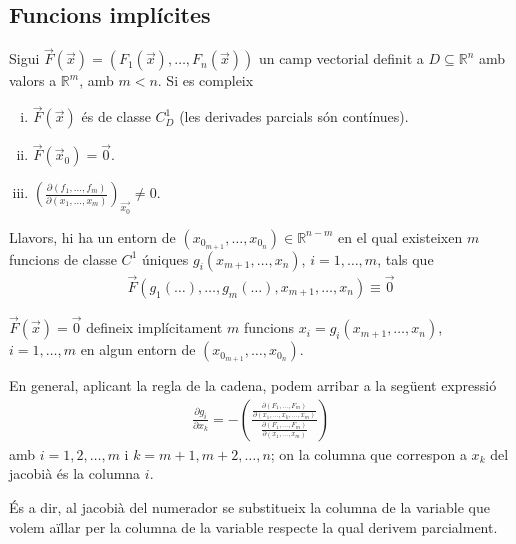 \subsection{Funcions implícites}
\begin{thm}
    Sigui $\vec{F}(\vec{x}) = (F_{1}(\vec{x}), \dots, F_{n}(\vec{x}))$ un camp vectorial definit a $D \subseteq \mathbb{R}^{n}$ amb valors a $\mathbb{R}^{m}$, amb $m<n$. Si es compleix
    \begin{enumerate}[i)]
        \item $\vec{F}(\vec{x})$ és de classe $C^{1}_{D}$ (les derivades parcials són contínues).
        \item $\vec{F}(\vec{x}_{0}) = \vec{0}$. 
        \item $\displaystyle \left( \frac{\partial (f_{1}, \dots, f_{m})}{\partial (x_{1}, \dots, x_{m})} \right)_{\vec{x_{0}}} \neq 0$.
    \end{enumerate}
    Llavors, hi ha un entorn de $(x_{0_{m+1}}, \dots, x_{0_{n}}) \in \mathbb{R}^{n-m}$ en el qual existeixen $m$ funcions de classe $C^{1}$ úniques $g_{i} (x_{m+1}, \dots, x_{n})$, $i=1,\dots, m$, tals que 
    \begin{align}
        \vec{F}(g_{1}(\dots), \dots, g_{m}(\dots), x_{m+1}, \dots, x_{n}) \equiv \vec{0}
    \end{align}
\end{thm}
\begin{cor}
    $\vec{F}(\vec{x}) = \vec{0}$ defineix implícitament $m$ funcions $x_{i} = g_{i} (x_{m+1}, \dots, x_{n})$, $i=1,\dots, m$ en algun entorn de $(x_{0_{m+1}}, \dots, x_{0_{n}})$.
\end{cor}
En general, aplicant la regla de la cadena, podem arribar a la següent expressió
\begin{align}
    \frac{\partial g_{i}}{\partial x_{k}} = - \left( \frac{\displaystyle \frac{\partial (F_{1}, \dots , F_{m})}{\partial (x_{1}, \dots , x_{k} , \dots , x_{m})}}{\displaystyle \frac{\partial (F_{1}, \dots , F_{m})}{\partial (x_{1}, \dots , x_{m})}} \right)
\end{align}
amb $i = 1, 2, \dots, m$ i $k = m+1, m+2, \dots, n$; on la columna que correspon a $x_{k}$ del jacobià és la columna $i$. 

És a dir, al jacobià del numerador se substitueix la columna de la variable que volem aïllar per la columna de la variable respecte la qual derivem parcialment.

